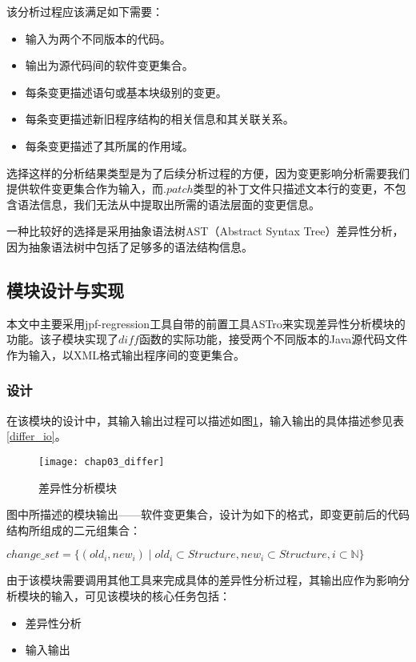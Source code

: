 该分析过程应该满足如下需要：
\begin{itemize}
	\item 输入为两个不同版本的代码。
	\item 输出为源代码间的软件变更集合。
	\item 每条变更描述语句或基本块级别的变更。
	\item 每条变更描述新旧程序结构的相关信息和其关联关系。
	\item 每条变更描述了其所属的作用域。
\end{itemize}

选择这样的分析结果类型是为了后续分析过程的方便，因为变更影响分析需要我们提供软件变更集合作为输入，而$.patch$类型的补丁文件只描述文本行的变更，不包含语法信息，我们无法从中提取出所需的语法层面的变更信息。

一种比较好的选择是采用抽象语法树AST（Abstract Syntax Tree）差异性分析，因为抽象语法树中包括了足够多的语法结构信息。

\subsection{模块设计与实现}

本文中主要采用jpf-regression工具自带的前置工具ASTro来实现差异性分析模块的功能。该子模块实现了$diff$函数的实际功能，接受两个不同版本的Java源代码文件作为输入，以XML格式输出程序间的变更集合。

\subsubsection{设计}

在该模块的设计中，其输入输出过程可以描述如图\ref {differ}，输入输出的具体描述参见表\ref {differ_io}。

\begin{figure}[H]
	\centering
	\texttt{[image: chap03\_differ]}
	\caption {差异性分析模块}
	\label {differ}	
\end{figure}

图中所描述的模块输出——软件变更集合，设计为如下的格式，即变更前后的代码结构所组成的二元组集合：
\begin{definition}
	$ change\_set = \{ (old_i,new_i) \mid  old_i \subset Structure,new_i \subset Structure, i \subset \mathbb{N} \}$
\end{definition}

由于该模块需要调用其他工具来完成具体的差异性分析过程，其输出应作为影响分析模块的输入，可见该模块的核心任务包括：
\begin{itemize}
	\item 差异性分析
	\item 输入输出
\end{itemize}


